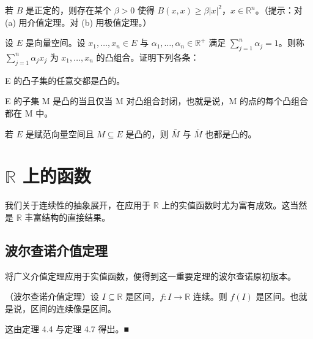 \begin{exercises}
\begin{items}
\item

若 $B$ 是正定的，则存在某个 $\beta > 0$ 使得 $B(x, x) \geq \beta |x|^2$，$x \in \mathbb{R}^n$。（提示：对 (a) 用介值定理。对 (b) 用极值定理。）

\end{items}

\item

设 $E$ 是向量空间。设 $x_1, \ldots, x_n \in E$ 与 $\alpha_1, \ldots, \alpha_n \in \mathbb{R}^+$ 满足 $\sum_{j=1}^n \alpha_j = 1$。则称 $\sum_{j=1}^n \alpha_j x_j$ 为 $x_1, \ldots, x_n$ 的凸组合。证明下列各条：

\begin{items}
\item

E 的凸子集的任意交都是凸的。

\item

E 的子集 M 是凸的当且仅当 M 对凸组合封闭，也就是说，M 的点的每个凸组合都在 M 中。

\item

若 $E$ 是赋范向量空间且 $M \subseteq E$ 是凸的，则 $\bar{M}$ 与 $\overline{M}$ 也都是凸的。

\end{items}

\end{exercises}

\section{$ \mathbb{R} $ 上的函数}

我们关于连续性的抽象展开，在应用于 $ \mathbb{R} $ 上的实值函数时尤为富有成效。这当然是 $ \mathbb{R} $ 丰富结构的直接结果。

\subsection*{波尔查诺介值定理}

将广义介值定理应用于实值函数，便得到这一重要定理的波尔查诺原初版本。

\begin{theorem}

（波尔查诺介值定理）设 $ I \subseteq \mathbb{R} $ 是区间，$ f: I \to \mathbb{R} $ 连续。则 $ f(I) $ 是区间。也就是说，区间的连续像是区间。

\proofhead
这由定理 4.4 与定理 4.7 得出。■
\end{theorem}

